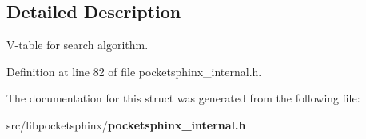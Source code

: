 \subsection{Detailed Description}
V-\/table for search algorithm. 

Definition at line 82 of file pocketsphinx\+\_\+internal.\+h.



The documentation for this struct was generated from the following file\+:\begin{DoxyCompactItemize}
\item 
src/libpocketsphinx/{\bf pocketsphinx\+\_\+internal.\+h}\end{DoxyCompactItemize}
